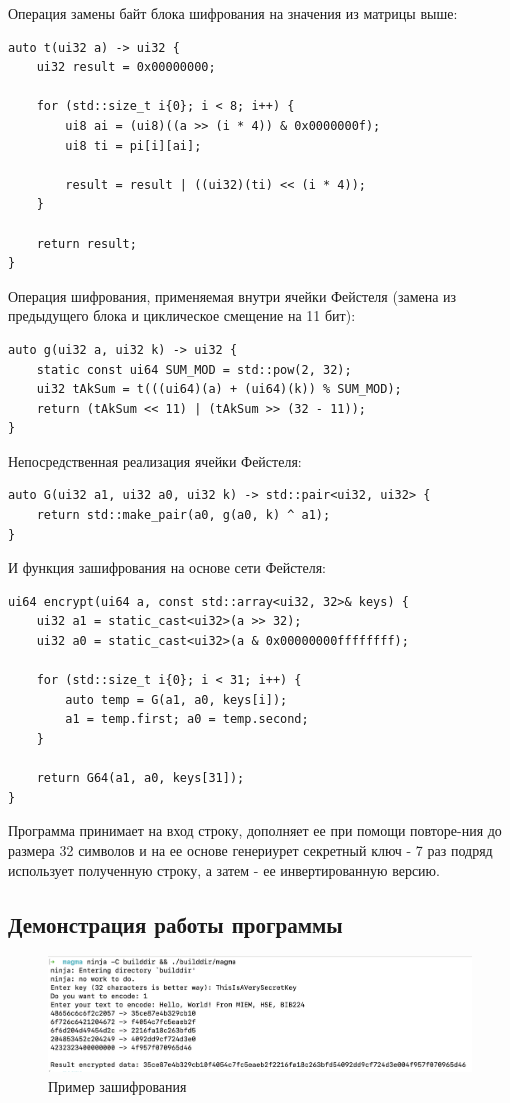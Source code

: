 \documentclass[a4paper]{article}
\begin{document}
  Операция замены байт блока шифрования на значения из матрицы выше:
  \begin{verbatim}
auto t(ui32 a) -> ui32 {
    ui32 result = 0x00000000;

    for (std::size_t i{0}; i < 8; i++) {
        ui8 ai = (ui8)((a >> (i * 4)) & 0x0000000f);
        ui8 ti = pi[i][ai];

        result = result | ((ui32)(ti) << (i * 4));
    }

    return result;
}
  \end{verbatim}

  Операция шифрования, применяемая внутри ячейки Фейстеля (замена из предыдущего блока и циклическое смещение на 11 бит):
  \begin{verbatim}
auto g(ui32 a, ui32 k) -> ui32 {
    static const ui64 SUM_MOD = std::pow(2, 32);
    ui32 tAkSum = t(((ui64)(a) + (ui64)(k)) % SUM_MOD);
    return (tAkSum << 11) | (tAkSum >> (32 - 11));
}
  \end{verbatim}

  Непосредственная реализация ячейки Фейстеля:
  \begin{verbatim}
auto G(ui32 a1, ui32 a0, ui32 k) -> std::pair<ui32, ui32> {
    return std::make_pair(a0, g(a0, k) ^ a1);
}
  \end{verbatim}

  \newpage
  И функция зашифрования на основе сети Фейстеля:
  \begin{verbatim}
ui64 encrypt(ui64 a, const std::array<ui32, 32>& keys) {
    ui32 a1 = static_cast<ui32>(a >> 32);
    ui32 a0 = static_cast<ui32>(a & 0x00000000ffffffff);

    for (std::size_t i{0}; i < 31; i++) {
        auto temp = G(a1, a0, keys[i]);
        a1 = temp.first; a0 = temp.second;
    }

    return G64(a1, a0, keys[31]);
}
  \end{verbatim}

  Программа принимает на вход строку, дополняет ее при помощи
  повторе-ния до размера 32 символов и на ее основе генериурет секретный ключ -
  7 раз подряд использует полученную строку, а затем - ее инвертированную версию.

  \subsection{Демонстрация работы программы}

  \begin{figure}[H]
    \includegraphics[width=\textwidth]{16_2}
    \caption{Пример зашифрования}
  \end{figure}
\end{document}
